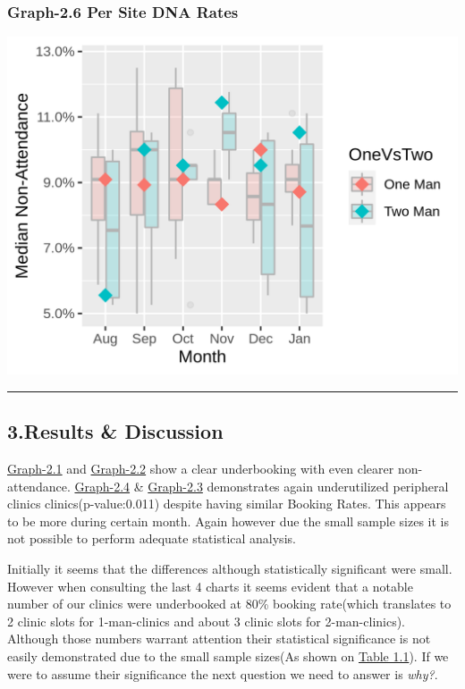 \documentclass[]{article}
\begin{document}
\hypertarget{graph-2.6-per-site-dna-rates}{%
\subsubsection{Graph-2.6 Per Site DNA
Rates}\label{graph-2.6-per-site-dna-rates}}

\begin{center}\includegraphics{LF2_files/figure-latex/unnamed-chunk-10-1} \end{center}

\begin{center}\rule{0.5\linewidth}{0.5pt}\end{center}

\hypertarget{results-discussion}{%
\subsection{3.Results \& Discussion}\label{results-discussion}}

\protect\hyperlink{graph2.1}{Graph-2.1} and
\protect\hyperlink{graph2.2}{Graph-2.2} show a clear underbooking with
even clearer non-attendance. \protect\hyperlink{graph2.4}{Graph-2.4} \&
\protect\hyperlink{graph2.3}{Graph-2.3} demonstrates again underutilized
peripheral clinics clinics(p-value:0.011) despite having similar Booking
Rates. This appears to be more during certain month. Again however due
the small sample sizes it is not possible to perform adequate
statistical analysis.

Initially it seems that the differences although statistically
significant were small. However when consulting the last 4 charts it
seems evident that a notable number of our clinics were underbooked at
80\% booking rate(which translates to 2 clinic slots for 1-man-clinics
and about 3 clinic slots for 2-man-clinics). Although those numbers
warrant attention their statistical significance is not easily
demonstrated due to the small sample sizes(As shown on
\protect\hyperlink{table_1.1}{Table 1.1}). If we were to assume their
significance the next question we need to answer is \emph{why?}.
\end{document}
